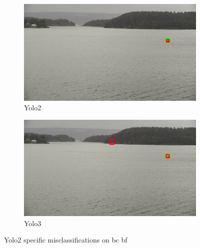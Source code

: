 \begin{figure}[h!]
\begin{subfigure}{.5\textwidth}
  \centering
  \includegraphics[width=0.9\linewidth]{results/case_buildings/yolo23/2better/yolo2/selected_08_09_frame5360.jpg}
  \caption{Yolo2}
\end{subfigure}%
\begin{subfigure}{.5\textwidth}
  \centering
  \includegraphics[width=.9\linewidth]{results/case_buildings/yolo23/2better/yolo3/selected_08_09_frame5360.jpg}
  \caption{Yolo3}
\end{subfigure}
\caption{Yolo2 specific misclassifications on bc bf}
\label{img:yolo2_misclas}


\end{figure}
